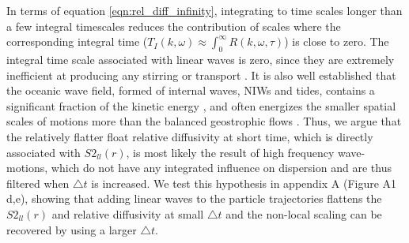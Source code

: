 \documentclass[]{ametsoc}
\begin{document}
In terms of equation \ref{eqn:rel_diff_infinity}, integrating to time scales longer than a few integral timescales reduces the contribution of scales where the corresponding integral time ($T_I(k, \omega) \approx \int_0^\infty R(k, \omega, \tau)$) is close to zero. The integral time scale associated with linear waves is zero, since they are extremely inefficient at producing any stirring or transport \citep{buhler2013strong, buhler2016particle, balwada2018submesoscale}. It is also well established that the oceanic wave field, formed of internal waves, NIWs and tides, contains a significant fraction of the kinetic energy \citep{ferrari2009ocean}, and often energizes the smaller spatial scales of motions more than the balanced geostrophic flows \citep{buhler2014}. Thus, we argue that the relatively flatter float relative diffusivity at short time, which is directly associated with $S2_{ll}(r)$, is most likely the result of high frequency wave-motions, which do not have any integrated influence on dispersion and are thus filtered when $\triangle t$ is increased. We test this hypothesis in appendix A (Figure A1 d,e), showing that adding linear waves to the particle trajectories flattens the $S2_{ll}(r)$ and relative diffusivity at small $\triangle t$ and the non-local scaling can be recovered by using a larger $\triangle t$. 
\end{document}
